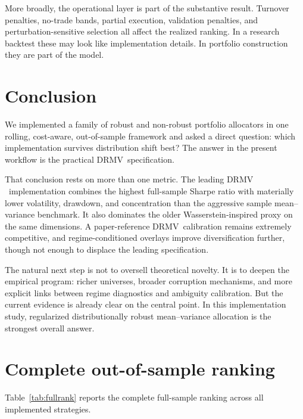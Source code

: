 \documentclass[11pt]{article}
\newcommand{\DRMV}{\ensuremath{\mathrm{DRMV}}}
\begin{document}
More broadly, the operational layer is part of the substantive result. Turnover penalties, no-trade bands, partial execution, validation penalties, and perturbation-sensitive selection all affect the realized ranking. In a research backtest these may look like implementation details. In portfolio construction they are part of the model.

\section{Conclusion}

We implemented a family of robust and non-robust portfolio allocators in one rolling, cost-aware, out-of-sample framework and asked a direct question: which implementation survives distribution shift best? The answer in the present workflow is the practical \DRMV\ specification.

That conclusion rests on more than one metric. The leading \DRMV\ implementation combines the highest full-sample Sharpe ratio with materially lower volatility, drawdown, and concentration than the aggressive sample mean--variance benchmark. It also dominates the older Wasserstein-inspired proxy on the same dimensions. A paper-reference \DRMV\ calibration remains extremely competitive, and regime-conditioned overlays improve diversification further, though not enough to displace the leading specification.

The natural next step is not to oversell theoretical novelty. It is to deepen the empirical program: richer universes, broader corruption mechanisms, and more explicit links between regime diagnostics and ambiguity calibration. But the current evidence is already clear on the central point. In this implementation study, regularized distributionally robust mean--variance allocation is the strongest overall answer.

\appendix

\section{Complete out-of-sample ranking}

Table~\ref{tab:fullrank} reports the complete full-sample ranking across all implemented strategies.
\end{document}
